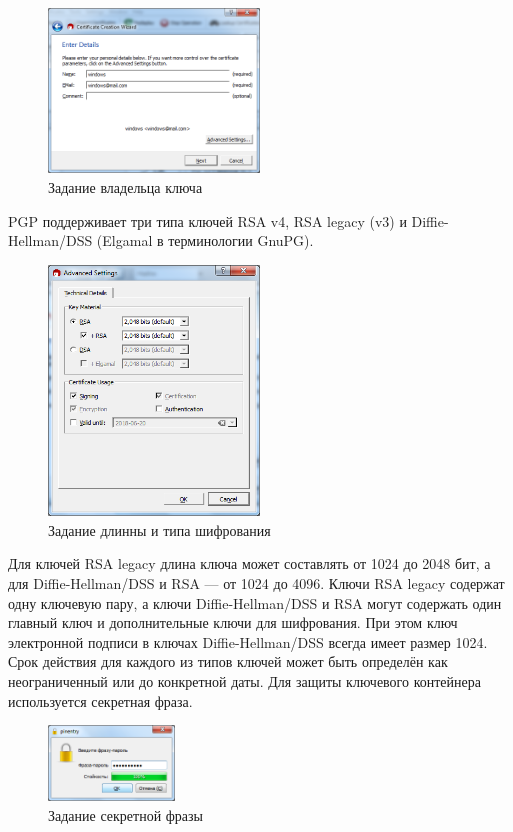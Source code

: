 \begin{figure}[!ht]
	\centering
	\includegraphics[width=0.5\textwidth]{images/3.png}
	\caption{Задание владельца ключа}
\end{figure}

PGP поддерживает три типа ключей RSA v4, RSA legacy (v3) и Diffie-Hellman/DSS (Elgamal в терминологии GnuPG).

\begin{figure}[!ht]
	\centering
	\includegraphics[width=0.5\textwidth]{images/4.png}
	\caption{Задание длинны и типа шифрования}
\end{figure}

Для ключей RSA legacy длина ключа может составлять от 1024 до 2048 бит, а для Diffie-Hellman/DSS и RSA — от 1024 до 4096. Ключи RSA legacy содержат одну ключевую пару, а ключи Diffie-Hellman/DSS и RSA могут содержать один главный ключ и дополнительные ключи для шифрования. При этом ключ электронной подписи в ключах Diffie-Hellman/DSS всегда имеет размер 1024. Срок действия для каждого из типов ключей может быть определён как неограниченный или до конкретной даты. Для защиты ключевого контейнера используется секретная фраза.

\begin{figure}[!ht]
	\centering
	\includegraphics[width=0.3\textwidth]{images/5.png}
	\caption{Задание секретной фразы}
\end{figure}


